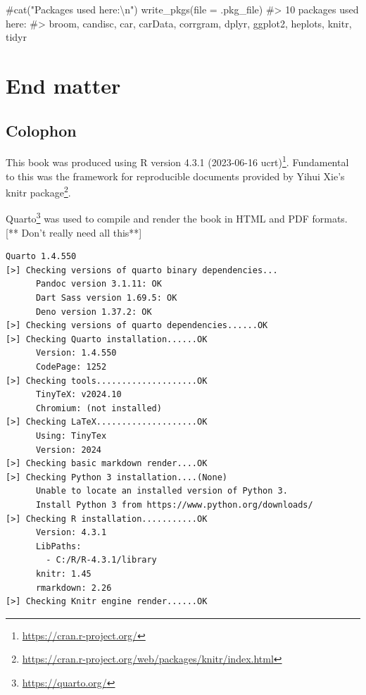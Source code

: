 \documentclass[
  letterpaper,
  10pt,
  krantz2]{krantz}
\makeatletter
\newenvironment{Shaded}{\begin{snugshade}}{\end{snugshade}}
\newcommand{\AttributeTok}[1]{\textcolor[rgb]{0.40,0.45,0.13}{#1}}
\newcommand{\CommentTok}[1]{\textcolor[rgb]{0.37,0.37,0.37}{#1}}
\newcommand{\FunctionTok}[1]{\textcolor[rgb]{0.28,0.35,0.67}{#1}}
\newcommand{\NormalTok}[1]{\textcolor[rgb]{0.00,0.23,0.31}{#1}}
\providecommand{\href}[2]{#2\footnote{\url{#1}}}
\newenvironment{kframe}{%
  \medskip{}
  \setlength{\fboxsep}{.8em}
  \def\at@end@of@kframe{}%
  \ifinner\ifhmode%
  \def\at@end@of@kframe{\end{minipage}}%
  \begin{minipage}{\columnwidth}%
  \fi\fi%
  \def\FrameCommand##1{\hskip\@totalleftmargin \hskip-\fboxsep
  \colorbox{shadecolor}{##1}\hskip-\fboxsep
      \hskip-\linewidth \hskip-\@totalleftmargin \hskip\columnwidth}%
  \MakeFramed {\advance\hsize-\width
    \@totalleftmargin\z@ \linewidth\hsize
    \@setminipage}}%
{\par\unskip\endMakeFramed%
  \at@end@of@kframe}
\renewenvironment{Shaded}{\begin{kframe}}{\end{kframe}}
\makeatother
\begin{document}
\begin{Shaded}
\begin{Highlighting}[]
\CommentTok{\#cat("Packages used here:\textbackslash{}n")}
\FunctionTok{write\_pkgs}\NormalTok{(}\AttributeTok{file =}\NormalTok{ .pkg\_file)}
\CommentTok{\#\textgreater{} 10  packages used here:}
\CommentTok{\#\textgreater{}  broom, candisc, car, carData, corrgram, dplyr, ggplot2, heplots, knitr, tidyr}
\end{Highlighting}
\end{Shaded}

\part{End matter}

\chapter*{Colophon}\label{colophon}


This book was produced using \href{https://cran.r-project.org/}{R
version 4.3.1 (2023-06-16 ucrt)}. Fundamental to this was the framework
for reproducible documents provided by Yihui Xie's
\href{https://cran.r-project.org/web/packages/knitr/index.html}{knitr
package}.

\href{https://quarto.org/}{Quarto} was used to compile and render the
book in HTML and PDF formats. {[}** Don't really need all this**{]}

\begin{verbatim}
Quarto 1.4.550
[>] Checking versions of quarto binary dependencies...
      Pandoc version 3.1.11: OK
      Dart Sass version 1.69.5: OK
      Deno version 1.37.2: OK
[>] Checking versions of quarto dependencies......OK
[>] Checking Quarto installation......OK
      Version: 1.4.550
      CodePage: 1252
[>] Checking tools....................OK
      TinyTeX: v2024.10
      Chromium: (not installed)
[>] Checking LaTeX....................OK
      Using: TinyTex
      Version: 2024
[>] Checking basic markdown render....OK
[>] Checking Python 3 installation....(None)
      Unable to locate an installed version of Python 3.
      Install Python 3 from https://www.python.org/downloads/
[>] Checking R installation...........OK
      Version: 4.3.1
      LibPaths:
        - C:/R/R-4.3.1/library
      knitr: 1.45
      rmarkdown: 2.26
[>] Checking Knitr engine render......OK
\end{verbatim}
\end{document}
